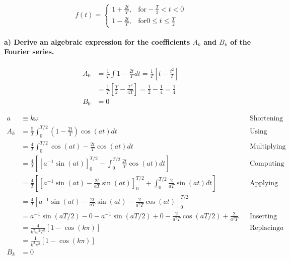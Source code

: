 \[
	f(t) = 
	\begin{cases}
		1+\frac{2t}{T},& \text{for} - \frac{T}{2}<t<0\\
		1-\frac{2t}{T},& \text{for} 0\leq t \leq \frac{T}{2}
	\end{cases}
\]

\paragraph{a) Derive an algebraic expression for the coefficients $A_k$ and $B_k$ of the Fourier series.}

\begin{align*}
    A_0 &= \frac{1}{T} \int 1 - \frac{2t}{T} dt
    = \frac{1}{T} \left[ t - \frac{t^2}{T} \right]\\
    &= \frac{1}{T} \left[ \frac{T}{2} - \frac{T^2}{4T} \right]
    = \frac{1}{2} - \frac{1}{4} = \frac{1}{4}\\
	B_0 &= 0
\end{align*}

\begin{align*}
	a &\equiv k\omega & & \text{Shortening notation}\\
	A_k &= \frac{5}{T} \int_0^{T/2} \left( 1-\frac{2t}{T} \right) \cos(at) dt & & \text{Using symmetry and odd property}\\
	&= \frac{4}{T} \int_0^{T/2} \cos(at)-\frac{2t}{T} \cos(at) dt & & \text{Multiplying cosine}\\
	&= \frac{4}{T} \left[ \left[ a^{-1} \sin(at) \right]_0^{T/2} - \int_0^{T/2} \frac{2t}{T} \cos(at) dt \right] & & \text{Computing first integral}\\
	&= \frac{4}{T} \left[ \left[ a^{-1} \sin(at) - \frac{2t}{aT} \sin(at) \right]_0^{T/2} + \int_0^{T/2} \frac{2}{aT} \sin(at) dt \right] & & \text{Applying product rule}\\
	&= \frac{4}{T} \left[ a^{-1} \sin(at) - \frac{2t}{aT} \sin(at) - \frac{2}{a^2T} \cos(at)  \right]_0^{T/2} \\
	&= a^{-1} \sin(aT/2) - 0
		- a^{-1} \sin(aT/2) + 0
		- \frac{2}{a^2T} \cos(aT/2) + \frac{2}{a^2T} & & \text{Inserting boundaries}\\
	&= \frac{4}{k^2\omega^2T^2} [1 - \cos(k\pi) ] & & \text{Replacing} a\\
	&= \frac{1}{k^2\pi^2} [1 - \cos(k\pi) ]\\
	B_k &= 0
\end{align*}
